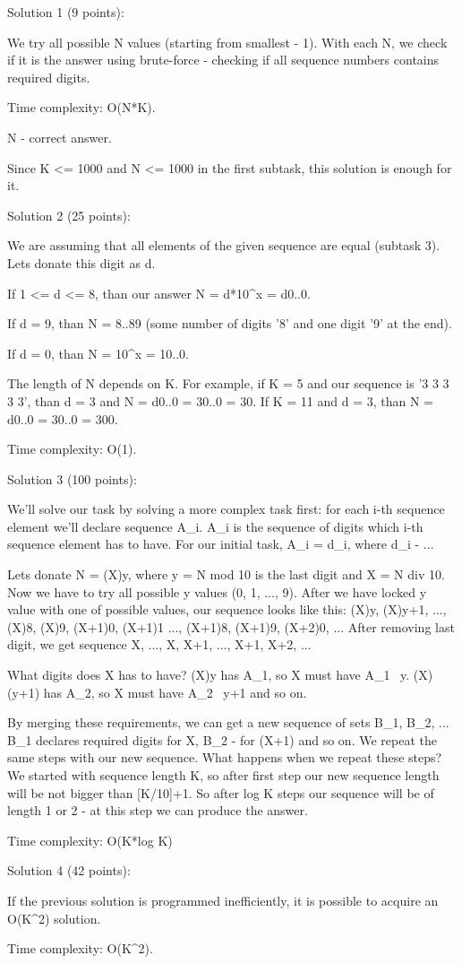 Solution 1 (9 points):

We try all possible N values (starting from smallest - 1).
With each N, we check if it is the answer using brute-force - checking if all sequence numbers contains required digits.

Time complexity: O(N*K).

N - correct answer.

Since K <= 1000 and N <= 1000 in the first subtask, this solution is enough for it. 



Solution 2 (25 points):

We are assuming that all elements of the given sequence are equal (subtask 3).
Lets donate this digit as d.

If 1 <= d <= 8, than our answer N = d*10^x = d0..0.

If d = 9, than N = 8..89 (some number of digits '8' and one digit '9' at the end).

If d = 0, than N = 10^x = 10..0.

The length of N depends on K.
For example, if K = 5 and our sequence is '3 3 3 3 3', than d = 3 and N = d0..0 = 30..0 = 30.
If K = 11 and d = 3, than N = d0..0 = 30..0 = 300.

Time complexity: O(1).



Solution 3 (100 points):

We'll solve our task by solving a more complex task first: for each i-th sequence element we'll declare sequence A_i.
A_i is the sequence of digits which i-th sequence element has to have.
For our initial task, A_i = {d_i}, where d_i - ...

Lets donate N = (X)y, where y = N mod 10 is the last digit and X = N div 10.
Now we have to try all possible y values (0, 1, ..., 9).
After we have locked y value with one of possible values, our sequence looks like this: (X)y, (X)y+1, ..., (X)8, (X)9, (X+1)0, (X+1)1 ..., (X+1)8, (X+1)9, (X+2)0, ...
After removing last digit, we get sequence X, ..., X, X+1, ..., X+1, X+2, ...

What digits does X has to have?
(X)y has A_1, so X must have A_1 \ {y}. (X)(y+1) has A_2, so X must have A_2 \ {y+1} and so on.

By merging these requirements, we can get a new sequence of sets B_1, B_2, ...
B_1 declares required digits for X, B_2 - for (X+1) and so on.
We repeat the same steps with our new sequence.
What happens when we repeat these steps?
We started with sequence length K, so after first step our new sequence length will be not bigger than [K/10]+1.
So after log K steps our sequence will be of length 1 or 2 - at this step we can produce the answer.

Time complexity: O(K*log K)



Solution 4 (42 points):

If the previous solution is programmed inefficiently, it is possible to acquire an O(K^2) solution.

Time complexity: O(K^2).
